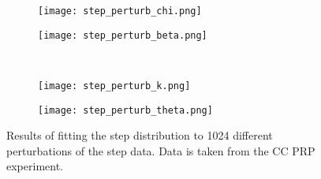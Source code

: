 \documentclass{article}
\begin{document}
\begin{figure}
  \centering
  \begin{subfigure}{0.48\textwidth}
    \texttt{[image: step\_perturb\_chi.png]}
  \end{subfigure}
  \hfill
  \begin{subfigure}{0.48\textwidth}
    \texttt{[image: step\_perturb\_beta.png]}
  \end{subfigure}
  \\
  \begin{subfigure}{0.48\textwidth}
    \texttt{[image: step\_perturb\_k.png]}
  \end{subfigure}
  \hfill
  \begin{subfigure}{0.48\textwidth}
    \texttt{[image: step\_perturb\_theta.png]}
  \end{subfigure}
  \caption{Results of fitting the step distribution to 1024 different
    perturbations of the step data. Data is taken from the CC PRP
    experiment.}
  \label{fig:step_perturb}
\end{figure}



\end{document}
